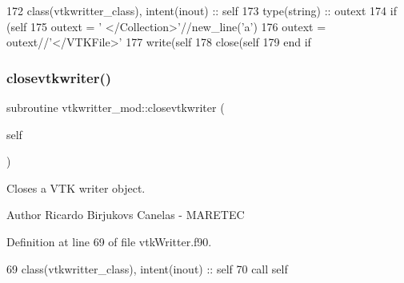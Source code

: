 \begin{DoxyCode}
172     \textcolor{keywordtype}{class}(vtkwritter\_class), \textcolor{keywordtype}{intent(inout)} :: self
173     \textcolor{keywordtype}{type}(string) :: outext
174     \textcolor{keywordflow}{if} (self%
175         outext = \textcolor{stringliteral}{'  </Collection>'}//new\_line(\textcolor{stringliteral}{'a'})
176         outext = outext//\textcolor{stringliteral}{'</VTKFile>'}
177         \textcolor{keyword}{write}(self%
178         \textcolor{keyword}{close}(self%
179 \textcolor{keywordflow}{    end if}    
\end{DoxyCode}
\mbox{\label{namespacevtkwritter__mod_a13f1b870d2367704bcd4143a80b552f9}} 
\subsubsection{\texorpdfstring{closevtkwriter()}{closevtkwriter()}}
{\footnotesize\ttfamily subroutine vtkwritter\+\_\+mod\+::closevtkwriter (\begin{DoxyParamCaption}\item[{class(\mbox{\hyperlink{structvtkwritter__mod_1_1vtkwritter__class}{vtkwritter\+\_\+class}}), intent(inout)}]{self }\end{DoxyParamCaption})\hspace{0.3cm}{\ttfamily [private]}}



Closes a V\+TK writer object. 

\begin{DoxyAuthor}{Author}
Ricardo Birjukovs Canelas -\/ M\+A\+R\+E\+T\+EC 
\end{DoxyAuthor}


Definition at line 69 of file vtk\+Writter.\+f90.


\begin{DoxyCode}
69     \textcolor{keywordtype}{class}(vtkwritter\_class), \textcolor{keywordtype}{intent(inout)} :: self
70     \textcolor{keyword}{call }self%
\end{DoxyCode}
\mbox{\label{namespacevtkwritter__mod_a9f44d9fd1c5da759c4f2d721d12a8181}} 
